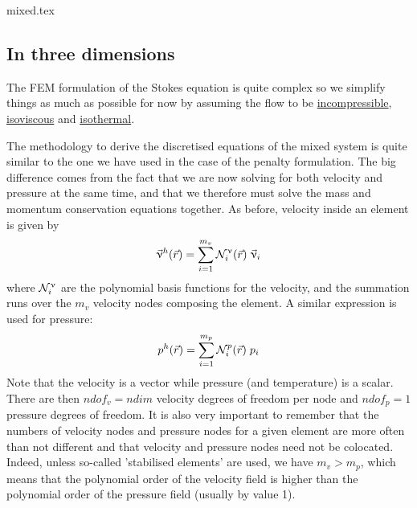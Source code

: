 \begin{flushright} {\tiny {\color{gray} mixed.tex}} \end{flushright}

\subsection{In three dimensions}

The FEM formulation of the Stokes equation is quite complex so 
we simplify things as much as possible for now by 
assuming the flow to be \underline{incompressible}, 
\underline{isoviscous} and \underline{isothermal}. 

The methodology to derive the discretised equations of the mixed system is 
quite similar to the one we have used in the case of the penalty formulation.
The big difference comes from the fact that we are now solving for both 
velocity and pressure at the same time, and that we therefore must solve 
the mass and momentum conservation equations together.
As before, velocity inside an element is given by 
\begin{equation}
{\vec \upnu}^h({\vec r})=\sum_{i=1}^{m_v} {\mathcal{N}}_i^\upnu({\vec r})\;  {\vec \upnu}_i
\label{mixed01}
\end{equation}
where ${\mathcal{N}}_i^{\upnu}$ are the polynomial basis functions for the velocity,
and the summation runs over the $m_v$ velocity nodes composing the element.
A similar expression is used for pressure:
\begin{equation}
p^h({\vec r})=\sum_{i=1}^{m_p} {\mathcal{N}}_i^p({\vec r}) \; p_i
\label{mixed02}
\end{equation}
Note that the velocity is a vector while pressure (and temperature)
is a scalar. There are then $ndof_v=ndim$ velocity degrees of freedom per node
and $ndof_p=1$ pressure degrees of freedom.
It is also very important to remember that the numbers of 
velocity nodes and pressure nodes for a given element 
are more often than not different and that velocity and pressure
nodes need not be colocated. Indeed, unless 
so-called 'stabilised elements' are used, we have $m_v>m_p$, which 
means that the polynomial order of the velocity field is higher than 
the polynomial order of the pressure field (usually by value 1).

